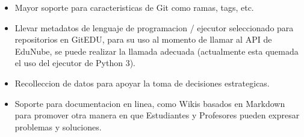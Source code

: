 \begin{itemize}
    \item Mayor soporte para caracteristicas de Git como ramas, tags, etc.
    \item Llevar metadatos de lenguaje de programacion / ejecutor seleccionado para repositorios en GitEDU, para su uso al momento de llamar al API de EduNube, se puede realizar la llamada adecuada (actualmente esta quemada el uso del ejecutor de Python 3).
    \item Recolleccion de datos para apoyar la toma de decisiones estrategicas.
    \item Soporte para documentacion en linea, como Wikis basados en Markdown para promover otra manera en que Estudiantes y Profesores pueden expresar problemas y soluciones.
\end{itemize}
